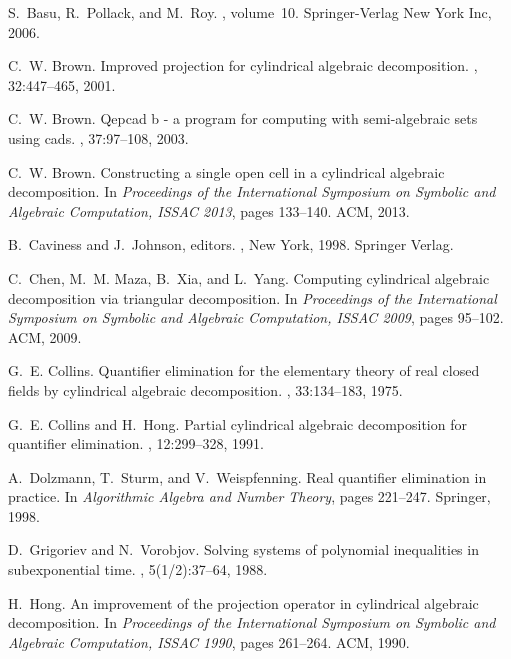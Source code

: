 \documentclass[english]{amsart}
\numberwithin{equation}{section}
\numberwithin{figure}{section}
\begin{document}



\begin{thebibliography}{10}

S.~Basu, R.~Pollack, and M.~Roy.
, volume~10.
\newblock Springer-Verlag New York Inc, 2006.

C.~W. Brown.
\newblock Improved projection for cylindrical algebraic decomposition.
, 32:447--465, 2001.

C.~W. Brown.
\newblock Qepcad b - a program for computing with semi-algebraic sets using
  cads.
, 37:97--108, 2003.

C.~W. Brown.
\newblock Constructing a single open cell in a cylindrical algebraic
  decomposition.
\newblock In {\em Proceedings of the International Symposium on Symbolic and
  Algebraic Computation, ISSAC 2013}, pages 133--140. ACM, 2013.

B.~Caviness and J.~Johnson, editors.
,
  New York, 1998. Springer Verlag.

C.~Chen, M.~M. Maza, B.~Xia, and L.~Yang.
\newblock Computing cylindrical algebraic decomposition via triangular
  decomposition.
\newblock In {\em Proceedings of the International Symposium on Symbolic and
  Algebraic Computation, ISSAC 2009}, pages 95--102. ACM, 2009.

G.~E. Collins.
\newblock Quantifier elimination for the elementary theory of real closed
  fields by cylindrical algebraic decomposition.
, 33:134--183, 1975.

G.~E. Collins and H.~Hong.
\newblock Partial cylindrical algebraic decomposition for quantifier
  elimination.
, 12:299--328, 1991.

A.~Dolzmann, T.~Sturm, and V.~Weispfenning.
\newblock Real quantifier elimination in practice.
\newblock In {\em Algorithmic Algebra and Number Theory}, pages 221--247.
  Springer, 1998.

D.~Grigoriev and N.~Vorobjov.
\newblock Solving systems of polynomial inequalities in subexponential time.
, 5(1/2):37--64, 1988.

H.~Hong.
\newblock An improvement of the projection operator in cylindrical algebraic
  decomposition.
\newblock In {\em Proceedings of the International Symposium on Symbolic and
  Algebraic Computation, ISSAC 1990}, pages 261--264. ACM, 1990.


\end{thebibliography}
\end{document}
